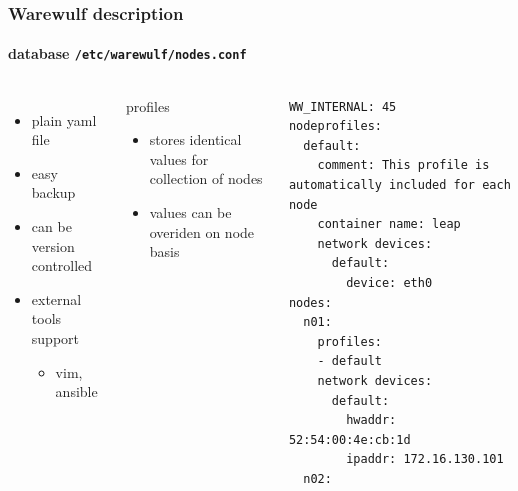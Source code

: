 \documentclass[aspectratio=169]{beamer}
\begin{document}
\begin{frame}[fragile]
\frametitle{Warewulf description}
\framesubtitle{database \texttt{/etc/warewulf/nodes.conf}}
\begin{columns}
\begin{itemize}
  \item plain yaml file
  \item easy backup
  \item can be version controlled
  \item external tools support
  \begin{itemize}
    \item vim, ansible
  \end{itemize}
\end{itemize}
\begin{block}{profiles}
\begin{itemize}
  \item stores identical values for collection of nodes
  \item values can be overiden on node basis
\end{itemize}
\end{block}
\begin{lstlisting}[style=yaml]
WW_INTERNAL: 45
nodeprofiles:
  default:
    comment: This profile is automatically included for each node
    container name: leap
    network devices:
      default:
        device: eth0
nodes:
  n01:
    profiles:
    - default
    network devices:
      default:
        hwaddr: 52:54:00:4e:cb:1d
        ipaddr: 172.16.130.101
  n02:
\end{lstlisting}
%
\end{columns}
\end{frame}
\end{document}
